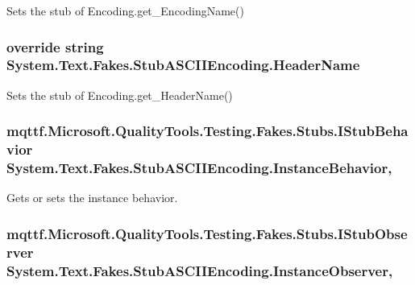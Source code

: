 Sets the stub of Encoding.\-get\-\_\-\-Encoding\-Name()

\hypertarget{class_system_1_1_text_1_1_fakes_1_1_stub_a_s_c_i_i_encoding_a492032d1ad248dbdf60bd9dec7d43ef2}{
\subsubsection[{Header\-Name}]{\setlength{\rightskip}{0pt plus 5cm}override string System.\-Text.\-Fakes.\-Stub\-A\-S\-C\-I\-I\-Encoding.\-Header\-Name\hspace{0.3cm}{\ttfamily [get]}}}\label{class_system_1_1_text_1_1_fakes_1_1_stub_a_s_c_i_i_encoding_a492032d1ad248dbdf60bd9dec7d43ef2}


Sets the stub of Encoding.\-get\-\_\-\-Header\-Name()

\hypertarget{class_system_1_1_text_1_1_fakes_1_1_stub_a_s_c_i_i_encoding_ae5fe28ee6f3883bd10673951dae5b65d}{
\subsubsection[{Instance\-Behavior}]{\setlength{\rightskip}{0pt plus 5cm}mqttf.\-Microsoft.\-Quality\-Tools.\-Testing.\-Fakes.\-Stubs.\-I\-Stub\-Behavior System.\-Text.\-Fakes.\-Stub\-A\-S\-C\-I\-I\-Encoding.\-Instance\-Behavior\hspace{0.3cm}{\ttfamily [get]}, {\ttfamily [set]}}}\label{class_system_1_1_text_1_1_fakes_1_1_stub_a_s_c_i_i_encoding_ae5fe28ee6f3883bd10673951dae5b65d}


Gets or sets the instance behavior.

\hypertarget{class_system_1_1_text_1_1_fakes_1_1_stub_a_s_c_i_i_encoding_ad46915b9fc7f11e878048c380ae7c638}{
\subsubsection[{Instance\-Observer}]{\setlength{\rightskip}{0pt plus 5cm}mqttf.\-Microsoft.\-Quality\-Tools.\-Testing.\-Fakes.\-Stubs.\-I\-Stub\-Observer System.\-Text.\-Fakes.\-Stub\-A\-S\-C\-I\-I\-Encoding.\-Instance\-Observer\hspace{0.3cm}{\ttfamily [get]}, {\ttfamily [set]}}}\label{class_system_1_1_text_1_1_fakes_1_1_stub_a_s_c_i_i_encoding_ad46915b9fc7f11e878048c380ae7c638}


